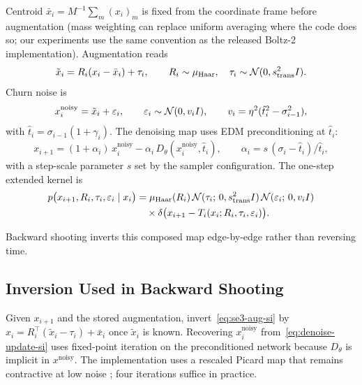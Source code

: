 Centroid $\bar{x}_i = M^{-1}\sum_m (x_i)_m$ is fixed from the coordinate frame before augmentation (mass weighting can replace uniform averaging where the code does so; our experiments use the same convention as the released Boltz-2 implementation). Augmentation reads
\begin{equation}
  \label{eq:se3-aug-si}
  \tilde{x}_i = R_i (x_i - \bar{x}_i) + \tau_i,
  \qquad
  R_i \sim \mu_{\mathrm{Haar}},\quad
  \tau_i \sim \mathcal{N}(0, s_{\mathrm{trans}}^2 I).
\end{equation}
Churn noise is
\begin{equation}
  \label{eq:churn-si}
  x^{\mathrm{noisy}}_i = \tilde{x}_i + \varepsilon_i,
  \qquad
  \varepsilon_i \sim \mathcal{N}(0, v_i I),
  \qquad
  v_i = \eta^2(\hat{t}_i^2 - \sigma_{i-1}^2),
\end{equation}
with $\hat{t}_i = \sigma_{i-1}(1+\gamma_i)$. The denoising map uses EDM preconditioning at $\hat{t}_i$:
\begin{equation}
  \label{eq:denoise-update-si}
  x_{i+1} = (1+\alpha_i)\,x^{\mathrm{noisy}}_i
            - \alpha_i\, D_\theta(x^{\mathrm{noisy}}_i, \hat{t}_i),
  \qquad
  \alpha_i = s\,(\sigma_i - \hat{t}_i)/\hat{t}_i,
\end{equation}
with a step-scale parameter $s$ set by the sampler configuration. The one-step extended kernel is
\begin{align}
  \label{eq:kernel-extended-si}
  p\bigl(x_{i+1}, R_i, \tau_i, \varepsilon_i \mid x_i\bigr)
  &= \mu_{\mathrm{Haar}}(R_i)\,
     \mathcal{N}(\tau_i;\, 0, s_{\mathrm{trans}}^2 I)\,
     \mathcal{N}(\varepsilon_i;\, 0, v_i I) \nonumber\\
  &\quad \times
     \delta\bigl(x_{i+1} - T_i(x_i; R_i,\tau_i,\varepsilon_i)\bigr).
\end{align}

Backward shooting inverts this composed map edge-by-edge rather than reversing
time.

\subsection{Inversion Used in Backward Shooting}

Given $x_{i+1}$ and the stored augmentation, invert~\eqref{eq:se3-aug-si} by
$x_i = R_i^\top(\tilde{x}_i - \tau_i) + \bar{x}_i$ once $\tilde{x}_i$ is known. Recovering $x^{\mathrm{noisy}}_i$ from~\eqref{eq:denoise-update-si} uses fixed-point iteration on the preconditioned network because $D_\theta$ is implicit in $x^{\mathrm{noisy}}$. The implementation uses a rescaled Picard map that remains contractive at low noise \citep{boltz2}; four iterations suffice in practice.

